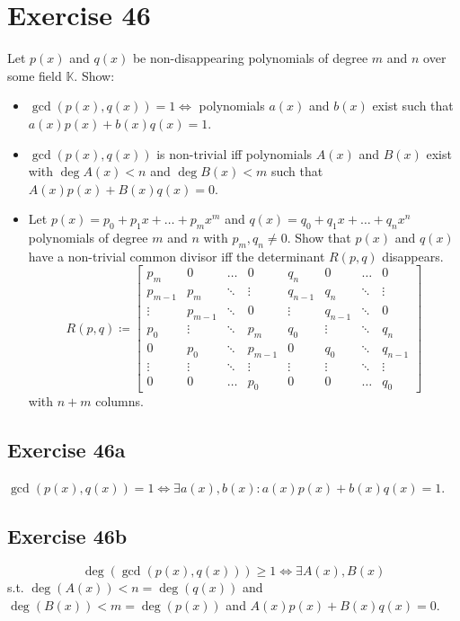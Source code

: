\documentclass[a4paper]{article}
\theoremstyle{definition}
\begin{document}
\section*{Exercise 46}
\begin{ex}
  Let $p(x)$ and $q(x)$ be non-disappearing polynomials of degree $m$ and $n$ over some field $\mathbb K$. Show:
  \begin{itemize}
    \item $\operatorname{gcd}(p(x), q(x)) = 1 \iff$ polynomials $a(x)$ and $b(x)$ exist such that $a(x) p(x) + b(x) q(x) = 1$.
    \item $\operatorname{gcd}(p(x), q(x))$ is non-trivial iff polynomials $A(x)$ and $B(x)$ exist with $\deg{A(x)} < n$ and $\deg{B(x)} < m$ such that $A(x) p(x) + B(x) q(x) = 0$.
    \item Let $p(x) = p_0 + p_1 x + \dots + p_m x^m$ and $q(x) = q_0 + q_1 x + \dots + q_n x^n$ polynomials of degree $m$ and $n$ with $p_m, q_n \neq 0$.
      Show that $p(x)$ and $q(x)$ have a non-trivial common divisor iff the determinant $R(p, q)$ disappears.
      \[
        R(p, q) \coloneqq \begin{bmatrix}
          p_m & 0 & \dots & 0 & q_n & 0 & \dots & 0 \\
          p_{m-1} & p_m & \ddots & \vdots & q_{n-1} & q_n & \ddots & \vdots \\
          \vdots & p_{m-1} & \ddots & 0 & \vdots & q_{n-1} & \ddots & 0 \\
          p_0 & \vdots & \ddots & p_m & q_0 & \vdots & \ddots & q_n \\
          0 & p_0 & \ddots & p_{m-1} & 0 & q_0 & \ddots & q_{n-1} \\
          \vdots & \vdots & \ddots & \vdots & \vdots & \vdots & \ddots & \vdots \\
          0 & 0 & \dots & p_0 & 0 & 0 & \dots & q_0
        \end{bmatrix}
      \]
      with $n + m$ columns.
  \end{itemize}
\end{ex}

\subsection{Exercise 46a}
$\operatorname{gcd}(p(x), q(x)) = 1 \iff \exists a(x), b(x): a(x) p(x) + b(x) q(x) = 1$.

\subsection{Exercise 46b}
\[ \deg(\operatorname{gcd}(p(x), q(x))) \geq 1 \iff \exists A(x), B(x) \]
s.t. $\deg(A(x)) < n = \deg(q(x))$ and $\deg(B(x)) < m = \deg(p(x))$
and $A(x) p(x) + B(x) q(x) = 0$.
\end{document}
